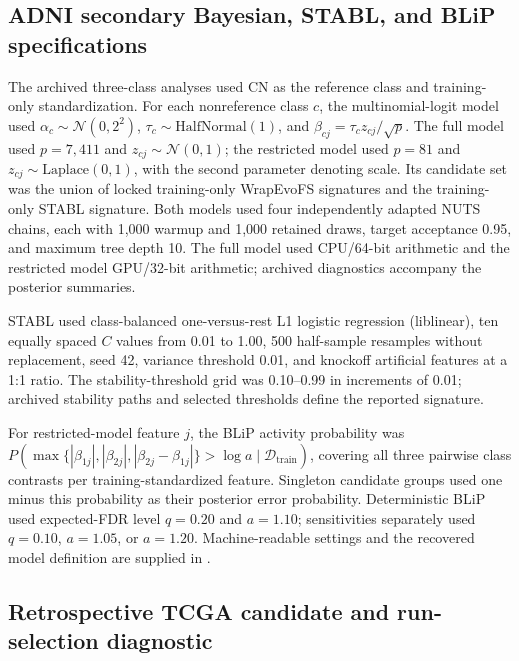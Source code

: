 \subsection{ADNI secondary Bayesian, STABL, and BLiP specifications}

The archived three-class analyses used CN as the reference class and training-only standardization. For each nonreference class $c$, the multinomial-logit model used $\alpha_c\sim\mathcal{N}(0,2^2)$, $\tau_c\sim\mathrm{HalfNormal}(1)$, and $\beta_{cj}=\tau_c z_{cj}/\sqrt{p}$. The full model used $p=7{,}411$ and $z_{cj}\sim\mathcal{N}(0,1)$; the restricted model used $p=81$ and $z_{cj}\sim\mathrm{Laplace}(0,1)$, with the second parameter denoting scale. Its candidate set was the union of locked training-only WrapEvoFS signatures and the training-only STABL signature. Both models used four independently adapted NUTS chains, each with 1,000 warmup and 1,000 retained draws, target acceptance 0.95, and maximum tree depth 10. The full model used CPU/64-bit arithmetic and the restricted model GPU/32-bit arithmetic; archived diagnostics accompany the posterior summaries.

STABL used class-balanced one-versus-rest L1 logistic regression (liblinear), ten equally spaced $C$ values from 0.01 to 1.00, 500 half-sample resamples without replacement, seed 42, variance threshold 0.01, and knockoff artificial features at a 1:1 ratio. The stability-threshold grid was 0.10--0.99 in increments of 0.01; archived stability paths and selected thresholds define the reported signature.

For restricted-model feature $j$, the BLiP activity probability was $P(\max\{|\beta_{1j}|,|\beta_{2j}|,|\beta_{2j}-\beta_{1j}|\}>\log a\mid\mathcal{D}_{\mathrm{train}})$, covering all three pairwise class contrasts per training-standardized feature. Singleton candidate groups used one minus this probability as their posterior error probability. Deterministic BLiP used expected-FDR level $q=0.20$ and $a=1.10$; sensitivities separately used $q=0.10$, $a=1.05$, or $a=1.20$. Machine-readable settings and the recovered model definition are supplied in .

\subsection{Retrospective TCGA candidate and run-selection diagnostic}

